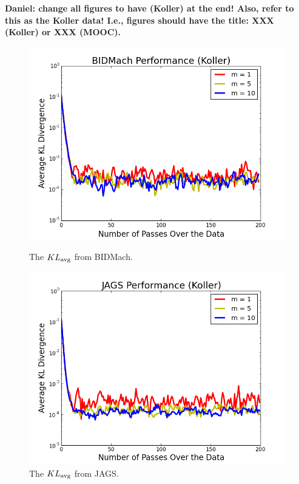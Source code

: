 \documentclass{article} %
\begin{document}
\textbf{Daniel: change all figures to have (Koller) at the end! Also, refer to this as the Koller
data! I.e., figures should have the title: XXX (Koller) or XXX (MOOC).}

\begin{figure}[t]
  \centering
  \begin{minipage}{.5\textwidth}
    \centering
    \includegraphics[width=1\textwidth]{fig_kldiv_koller_mb4_gpu}
    \caption{The $KL_{\rm avg}$ from BIDMach.}
    \label{fig:kl_bidmach}
  \end{minipage}\hfill
    \begin{minipage}{.5\textwidth}
    \centering
    \includegraphics[width=1\textwidth]{fig_kl_div_25_50_perc_jags}
    \caption{The $KL_{\rm avg}$ from JAGS.}
    \label{fig:kl_jags}
  \end{minipage}
\end{figure}
\end{document}
